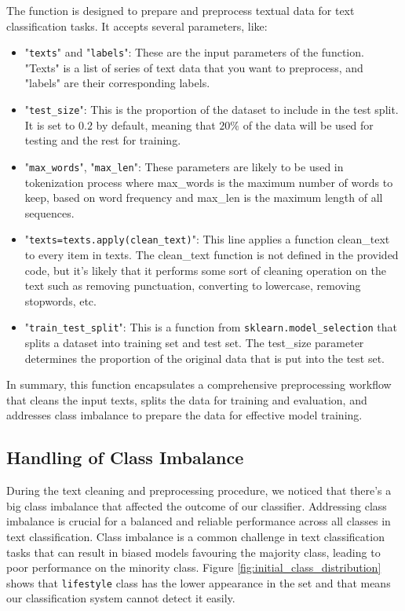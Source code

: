 The  function is designed to prepare and preprocess textual data for text classification tasks. It accepts several parameters, like:
\begin{itemize}
	\item "\verb*|texts|" and "\verb*|labels|": These are the input parameters of the function. "Texts" is a list of series of text data that you want to preprocess, and "labels" are their corresponding labels.
	
	\item "\verb*|test_size|": This is the proportion of the dataset to include in the test split. It is set to $0.2$ by default, meaning that $20\%$ of the data will be used for testing and the rest for training.
	
	\item "\verb*|max_words|", "\verb*|max_len|":  These parameters are likely to be used in tokenization process where max\_words is the maximum number of words to keep, based on word frequency and max\_len is the maximum length of all sequences.
	
	\item "\verb*|texts=texts.apply(clean_text)|": This line applies a function clean\_text to every item in texts. The clean\_text function is not defined in the provided code, but it's likely that it performs some sort of cleaning operation on the text such as removing punctuation, converting to lowercase, removing stopwords, etc.
	
	\item "\verb*|train_test_split|": This is a function from \verb*|sklearn.model_selection| that splits a dataset into training set and test set. The test\_size parameter determines the proportion of the original data that is put into the test set.
\end{itemize} 

In summary, this function encapsulates a comprehensive preprocessing workflow that cleans the input texts, splits the data for training and evaluation, and addresses class imbalance to prepare the data for effective model training. 

\subsection{Handling of Class Imbalance}
During the text cleaning and preprocessing procedure, we noticed that there's a big class imbalance that affected the outcome of our classifier. Addressing class imbalance is crucial for a balanced and reliable performance across all classes in text classification. Class imbalance is a common challenge in text classification tasks that can result in biased models favouring the majority class, leading to poor performance on the minority class. Figure \ref{fig:initial_class_distribution} shows that \verb|lifestyle| class has the lower appearance in the set and that means our classification system cannot detect it easily.

